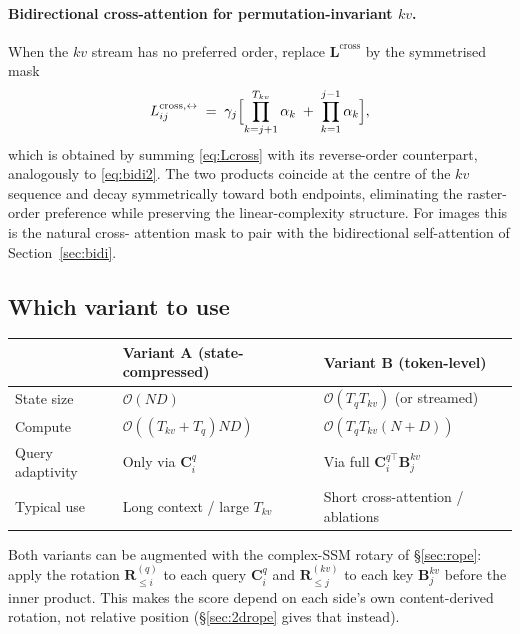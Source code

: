 \documentclass[11pt,a4paper]{article}
\begin{document}
\paragraph{Bidirectional cross-attention for permutation-invariant $kv$.}
When the $kv$ stream has no preferred order, replace
$\bm{L}^{\text{cross}}$ by the symmetrised mask
\begin{equation}\label{eq:Lcross-bi}
  L^{\text{cross},\leftrightarrow}_{ij}
     \;=\; \gamma_j\Bigl[\prod_{k=j+1}^{T_{kv}}\alpha_k
                         \;+\; \prod_{k=1}^{j-1}\alpha_k\Bigr],
\end{equation}
which is obtained by summing \eqref{eq:Lcross} with its reverse-order
counterpart, analogously to \eqref{eq:bidi2}. The two products coincide
at the centre of the $kv$ sequence and decay symmetrically toward both
endpoints, eliminating the raster-order preference while preserving the
linear-complexity structure. For images this is the natural cross-
attention mask to pair with the bidirectional self-attention of
Section~\ref{sec:bidi}.

\subsection{Which variant to use}

\begin{center}
\begin{tabular}{|l|l|l|}
\hline
 & \textbf{Variant A} (state-compressed) & \textbf{Variant B} (token-level)\\ \hline
State size        & $\mathcal{O}(ND)$             & $\mathcal{O}(T_q T_{kv})$ (or streamed) \\ \hline
Compute          & $\mathcal{O}((T_{kv}+T_q)ND)$ & $\mathcal{O}(T_q T_{kv}(N+D))$ \\ \hline
Query adaptivity & Only via $\bm{C}_i^q$         & Via full $\bm{C}_i^{q\top}\bm{B}_j^{kv}$ \\ \hline
Typical use      & Long context / large $T_{kv}$ & Short cross-attention / ablations \\ \hline
\end{tabular}
\end{center}

Both variants can be augmented with the complex-SSM rotary of
\S\ref{sec:rope}: apply the rotation $\bm{R}_{\le i}^{(q)}$ to each
query $\bm{C}_i^q$ and $\bm{R}_{\le j}^{(kv)}$ to each key
$\bm{B}_j^{kv}$ before the inner product. This makes the score
depend on each side's own content-derived rotation, not relative
position (\S\ref{sec:2drope} gives that instead).
\end{document}
